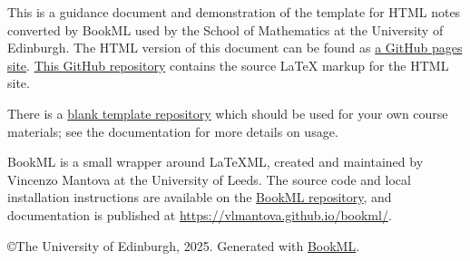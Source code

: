 \documentclass[12pt,oneside]{book}
\begin{document}


\maketitle

This is a guidance document and demonstration of the template for HTML notes converted by BookML used by the School of Mathematics at the University of Edinburgh. The HTML version of this document can be found as \href{https://uoe-school-of-mathematics.github.io/Workflow-Documentation/index.html}{a GitHub pages site}. \href{https://github.com/UoE-School-of-Mathematics/Workflow-Documentation}{This GitHub repository} contains the source LaTeX markup for the HTML site.

There is a \href{https://github.com/UoE-School-of-Mathematics/Workflow-Template-Blank}{blank template repository} which should be used for your own course materials; see the documentation for more details on usage.

BookML is a small wrapper around LaTeXML, created and maintained by Vincenzo Mantova at the University of Leeds. The source code and local installation instructions are available on the \href{https://github.com/vlmantova/bookml}{BookML repository}, and documentation is published at \url{https://vlmantova.github.io/bookml/}.


\tableofcontents




\iflatexml
    \copyright The University of Edinburgh, 2025. Generated with \href{https://vlmantova.github.io/bookml/}{BookML}.
\fi


% 

\mainmatter



\end{document}
